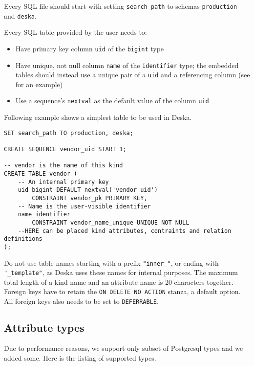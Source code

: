 \documentclass[deska]{subfiles}
\begin{document}
Every SQL file should start with
setting {\tt search\_path} to schemas {\tt production} and {\tt deska}.

Every SQL table provided by the user needs to:
\begin{itemize}
    \item Have primary key column {\tt uid} of the {\tt bigint} type
    \item Have unique, not null column {\tt name} of the {\tt identifier} type; the embedded tables should instead use a
        unique pair of a {\tt uid} and a referencing column (see  for an example)
    \item Use a sequence's {\tt nextval} as the default value of the column {\tt uid}
\end{itemize}

Following example shows a simplest table to be used in Deska.

\begin{verbatim}
SET search_path TO production, deska;

CREATE SEQUENCE vendor_uid START 1;

-- vendor is the name of this kind
CREATE TABLE vendor (
    -- An internal primary key
    uid bigint DEFAULT nextval('vendor_uid')
        CONSTRAINT vendor_pk PRIMARY KEY,
    -- Name is the user-visible identifier
    name identifier
        CONSTRAINT vendor_name_unique UNIQUE NOT NULL
    --HERE can be placed kind attributes, contraints and relation definitions
);
\end{verbatim}

Do not use table names starting with a prefix {\tt "inner\_"}, or ending with {\tt "\_template"}, as
Deska uses these names for internal purposes.  The maximum total length of a kind name and an attribute name is 20 characters
together.  Foreign keys have to retain the {\tt ON DELETE NO ACTION} stanza, a default option. All foreign keys also
needs to be set to {\tt DEFERRABLE}.

\subsection{Attribute types}
\label{sec:db-att-types}
Due to performance reasons, we support only subset of Postgresql types and we added some.
Here is the listing of supported types.
\end{document}
